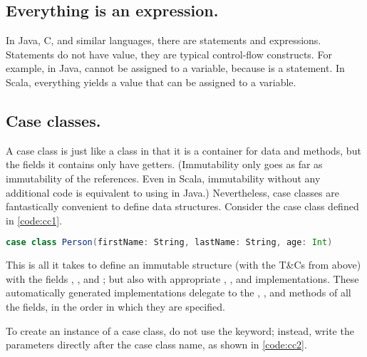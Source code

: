 \documentclass[10 pt]{article}
\begin{document}
\subsection{Everything is an expression.} 
In Java, C, and similar languages, there are statements and expressions. Statements do not have value, they are typical control-flow constructs. For example, in Java,  cannot be assigned to a variable, because  is a statement. In Scala, everything yields a value that can be assigned to a variable. 

\subsection{Case classes.} A case class is just like a class in that it is a container for data and methods, but the fields it contains only have getters. (Immutability only goes as far as immutability of the references. Even in Scala, immutability without any additional code is equivalent to using  in Java.) Nevertheless, case classes are fantastically convenient to define data structures. Consider the  case class defined in \autoref{code:cc1}.

\begin{lstlisting}[caption={Case class \pcode{Person}}, label={code:cc1}, language=Scala, escapechar=|]
case class Person(firstName: String, lastName: String, age: Int)
\end{lstlisting}

This is all it takes to define an immutable structure (with the T\&Cs from above) with the fields , , and ; but also with appropriate , , and  implementations. These automatically generated implementations delegate to the , , and  methods of all the fields, in the order in which they are specified.

To create an instance of a case class, do not use the  keyword; instead, write the parameters directly after the case class name, as shown in \autoref{code:cc2}.
\end{document}
